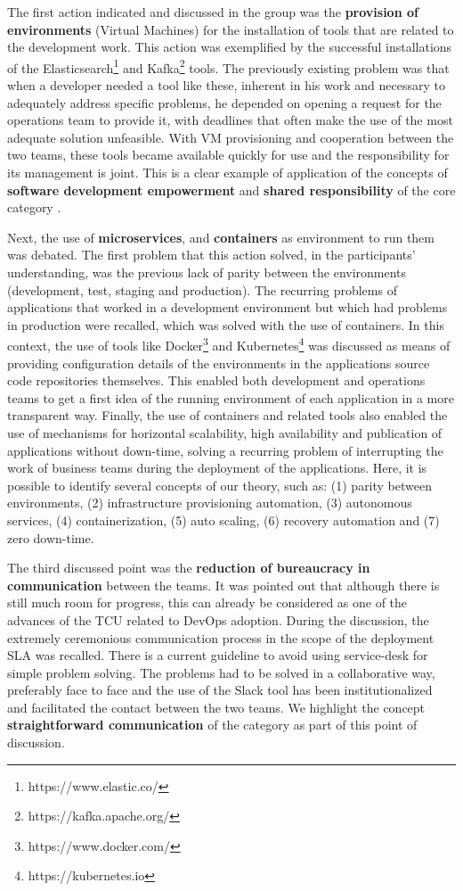{
\color{blue}
The first action indicated and discussed in the group was the \textbf{provision of
environments} (Virtual Machines) for the installation of tools that are related
to the development work. This action was exemplified by the successful
installations of the Elasticsearch\footnote{https://www.elastic.co/} and
Kafka\footnote{https://kafka.apache.org/} tools. The previously existing problem
was that when a developer needed a tool like these, inherent in his work and
necessary to adequately address specific problems, he depended on opening a
request for the operations team to provide it, with deadlines that often make
the use of the most adequate solution unfeasible. With VM provisioning and
cooperation between the two teams, these tools became available quickly for use
and the responsibility for its management is joint. This is a clear example of
application of the concepts of \textbf{software development empowerment} and
\textbf{shared responsibility} of the core category \cc.

Next, the use of \textbf{microservices}, and \textbf{containers} as environment
to run them was debated. The first problem that this action solved, in the
participants' understanding, was the previous lack of parity between the environments
(development, test, staging and production). The recurring problems of
applications that worked in a development environment but which had problems
in production were recalled, which was solved with the use of containers. In
this context, the use of tools like Docker\footnote{https://www.docker.com/}
and Kubernetes\footnote{https://kubernetes.io} was discussed as means of providing
configuration details of the environments in the applications source code
repositories themselves. This enabled both development and operations teams to
get a first idea of the running environment of each application in a more
transparent way. Finally, the use of containers and related tools also enabled
the use of mechanisms for horizontal scalability, high availability and
publication of applications without down-time, solving a recurring problem of
interrupting the work of business teams during the deployment of the applications.
Here, it is possible to identify several concepts of our theory, such as:
(1) parity between environments, (2) infrastructure provisioning automation,
(3) autonomous services, (4) containerization, (5) auto scaling, (6) recovery
automation and (7) zero down-time.

The third discussed point was the \textbf{reduction of bureaucracy in communication}
between the teams. It was pointed out that although there is still much room
for progress, this can already be considered as one of the advances of the TCU
related to DevOps adoption. During the discussion, the extremely ceremonious
communication process in the scope of the deployment SLA was recalled. There is
a current guideline to avoid using service-desk for simple problem solving. The
problems had to be solved in a collaborative way, preferably face to face and
the use of the Slack tool has been institutionalized and facilitated the contact
between the two teams. We highlight the concept \textbf{straightforward communication}
of the \cc category as part of this point of discussion.

}

